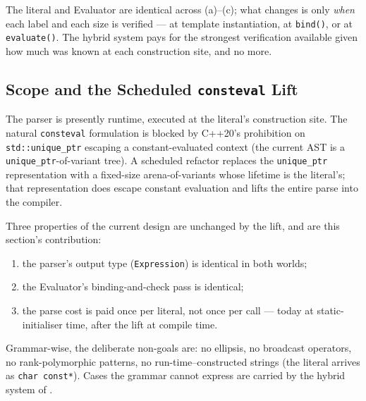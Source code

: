 \documentclass[10pt,twocolumn]{article}
\newcommand{\code}[1]{\texttt{#1}}
\begin{document}
The literal and Evaluator are identical across (a)--(c); what changes
is only \emph{when} each label and each size is verified --- at
template instantiation, at \code{bind()}, or at \code{evaluate()}.
The hybrid system pays for the strongest verification available given
how much was known at each construction site, and no more.

\subsection{Scope and the Scheduled \texorpdfstring{\code{consteval}}{consteval} Lift}
\label{sec:udl-limits-and-future}

The parser is presently runtime, executed at the literal's
construction site. The natural \code{consteval} formulation is
blocked by C++20's prohibition on \code{std::unique\_ptr} escaping a
constant-evaluated context (the current AST is a
\code{unique\_ptr}-of-variant tree). A scheduled refactor replaces
the \code{unique\_ptr} representation with a fixed-size
arena-of-variants whose lifetime is the literal's; that representation
does escape constant evaluation and lifts the entire parse into the
compiler.

Three properties of the current design are unchanged by the lift, and
are this section's contribution:

\begin{enumerate}
  \item the parser's output type (\code{Expression}) is identical in
        both worlds;
  \item the Evaluator's binding-and-check pass is identical;
  \item the parse cost is paid once per literal, not once per call
        --- today at static-initialiser time, after the lift at
        compile time.
\end{enumerate}

Grammar-wise, the deliberate non-goals are: no ellipsis, no broadcast
operators, no rank-polymorphic patterns, no run-time--constructed
strings (the literal arrives as \code{char const*}). Cases the
grammar cannot express are carried by the hybrid system of
.
\end{document}
